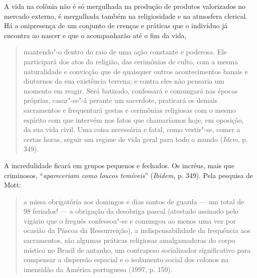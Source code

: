 A vida na colônia não é só mergulhada na produção de produtos
valorizados no mercado externo, é mergulhada também na religiosidade e
na atmosfera clerical. Há a onipresença de um conjunto de crenças e
práticas que o indivíduo já encontra ao nascer e que o acompanharão até
o fim da vida,

\begin{quote}
mantendo"-o dentro do raio de uma ação constante e poderosa. Ele
participará dos atos da religião, das cerimônias de culto, com a mesma
naturalidade e convicção que de quaisquer outros acontecimentos banais e
diuturnos da sua existência terrena; e contra eles não pensaria um
momento em reagir. Será batizado, confessará e comungará nas épocas
próprias, casar"-se"-á perante um sacerdote, praticará os demais
sacramentos e frequentará gestas e cerimônias religiosas com o mesmo
espírito com que intervém nos fatos que chamaríamos hoje, em oposição,
da sua vida civil. Uma coisa necessária e fatal, como vestir"-se, comer a
certas horas, seguir um regime de vida geral para todo o mundo
(\emph{Idem}, p. 349).
\end{quote}

A incredulidade ficará em grupos pequenos e fechados. Os incréus, mais
que criminosos, ``\emph{apareceriam como loucos
temíveis}'' (\emph{Ibidem}, p. 349). Pela pesquisa de Mott:

\begin{quote}
a missa obrigatória aos domingos e dias santos de guarda --- um total de
98 feriados! --- a obrigação da desobriga pascal (atestado assinado pelo
vigário que o freguês confessou"-se e comungou ao menos uma vez por
ocasião da Páscoa da Ressurreição), a indispensabilidade da frequência
aos sacramentos, são algumas práticas religiosas amalgamadoras do corpo
místico no Brasil de antanho, um contrapeso socializador significativo
para compensar a dispersão espacial e o isolamento social dos colonos na
imensidão da América portuguesa (1997, p. 159).
\end{quote}

